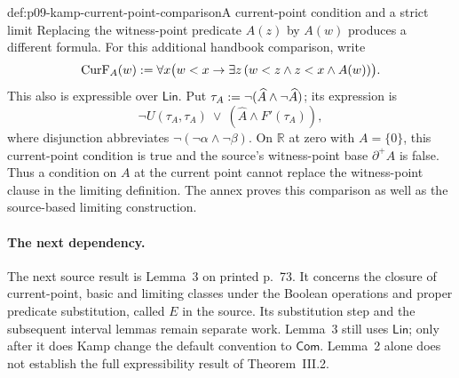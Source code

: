 \begin{hbexample}{def:p09-kamp-current-point-comparison}{A current-point condition and a strict limit}
Replacing the witness-point predicate \(A(z)\) by \(A(w)\) produces a
different formula.  For this additional handbook comparison, write
\[
 \operatorname{CurF}_A(w)\mathrel{:=}
  \forall x\bigl(w<x\to\exists z\,
                  (w<z\land z<x\land A(w))\bigr).
\]
This also is expressible over \(\mathsf{Lin}\).  Put
\(\tau_A\mathrel{:=}\neg(\widehat A\land\neg\widehat A)\); its expression is
\[
 \neg U(\tau_A,\tau_A)\ \lor\
                  (\widehat A\land F'(\tau_A)),
\]
where disjunction abbreviates \(\neg(\neg\alpha\land\neg\beta)\).
On \(\mathbb R\) at zero with \(A=\{0\}\), this current-point condition is
true and the source's witness-point base \(\partial^+A\) is false.
Thus a condition on \(A\) at the current point cannot replace the
witness-point clause in the limiting definition.  The annex proves this
comparison as well as the source-based limiting construction.
\end{hbexample}

\paragraph{The next dependency.}
The next source result is Lemma~3 on printed p.~73.  It concerns the closure
of current-point, basic and limiting classes under the Boolean operations
and proper predicate substitution, called \(E\) in the source.  Its
substitution step and the subsequent interval lemmas remain separate work.
Lemma~3 still uses \(\mathsf{Lin}\); only after it does Kamp change the
default convention to \(\mathsf{Com}\).  Lemma~2 alone does not establish
the full expressibility result of Theorem~III.2.
